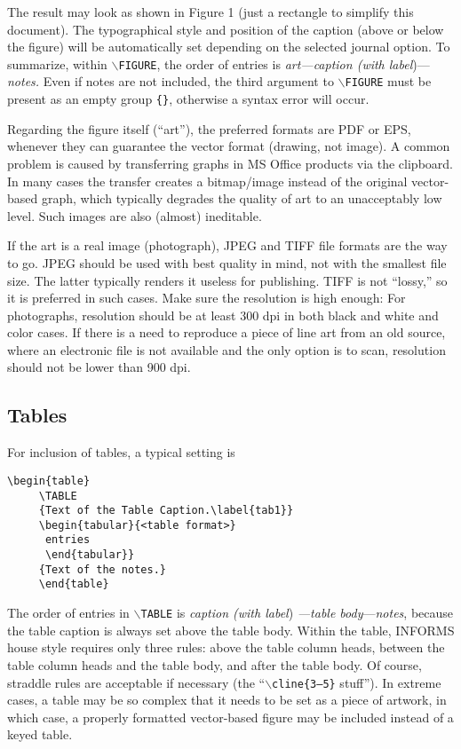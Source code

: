 \documentclass[ijds,nonblindrev]{informs4}
\begin{document}
\noindent
The result may look as shown in Figure 1 (just a rectangle to simplify this 
document). The typographical style and position of the caption (above or 
below the figure) will be automatically set depending on the selected 
journal option. To summarize, within \texttt{$\backslash $FIGURE}, the 
order of entries is {\it art---caption (with label})---{\it notes.} Even if notes are not included, the third argument 
to \texttt{$\backslash $FIGURE} must be present as an empty group \texttt{\{\}}, otherwise a syntax error will occur.

Regarding the figure itself (``art''), the preferred formats are PDF or EPS, 
whenever they can guarantee the vector format (drawing, not image). A common 
problem is caused by transferring graphs in MS Office products via the 
clipboard. In many cases the transfer creates a bitmap/image instead of the 
original vector-based graph, which typically degrades the quality of art to 
an unacceptably low level. Such images are also (almost) ineditable.

If the art is a real image (photograph), JPEG and TIFF file formats are the 
way to go. JPEG should be used with best quality in mind, not with the 
smallest file size. The latter typically renders it useless for publishing. 
TIFF is not ``lossy,'' so it is preferred in such cases. Make sure the 
resolution is high enough: For photographs, resolution should be at least 
300 dpi in both black and white and color cases. If there is a need to 
reproduce a piece of line art from an old source, where an electronic file 
is not available and the only option is to scan, resolution should not be 
lower than 900 dpi.

\subsection{Tables}\label{sec9.2}

For inclusion of tables, a typical setting is
\begin{Verbatim}[fontsize=\small]
     \begin{table}
     \TABLE
     {Text of the Table Caption.\label{tab1}}
     \begin{tabular}{<table format>} 
      entries
      \end{tabular}}
     {Text of the notes.}
     \end{table}
\end{Verbatim}

\noindent
The order of entries in \texttt{$\backslash $TABLE} is {\it caption
(with label}) {\it ---table body}---{\it notes}, because the  
table caption is always set above the table body. Within the table, INFORMS 
house style requires only three rules: above the table column heads, between 
the table column heads and the table body, and after the table body. Of 
course, straddle rules are acceptable if necessary (the
``\texttt{$\backslash $cline\{3---5\}} stuff''). In extreme cases, a table may be  
so complex that it needs to be set as a piece of artwork, in which case, a 
properly formatted vector-based figure may be included instead of a keyed 
table.
\end{document}
